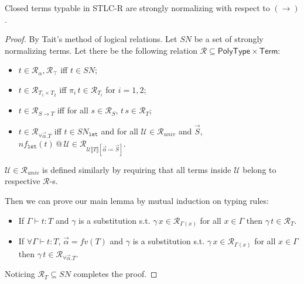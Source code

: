 \documentclass[acmsmall, review, screen, authorversion]{acmart}
\begin{document}
\begin{theorem}
    Closed terms typable in STLC-R are strongly normalizing with
    respect to $(\to)$.
\end{theorem}
\begin{proof}
    By Tait's method of logical relations. Let $SN$ be a set of
    strongly normalizing terms. Let there be the following relation
    $\mathcal{R}\subseteq\mathsf{PolyType}\times\mathsf{Term}$:

    \begin{itemize}
        \item $t\in\mathcal{R}_\alpha,\mathcal{R}_\top$ iff
            $t\in SN$;
        \item $t\in\mathcal{R}_{T_1\times T_2}$ iff
            $\pi_i\,t\in\mathcal{R}_{T_i}$ for $i=1,2$;
        \item $t\in\mathcal{R}_{S\to T}$ iff for all
            $s\in\mathcal{R}_S$, $t\,s\in\mathcal{R}_T$;
        \item $t\in\mathcal{R}_{\forall\vec{\alpha}.T}$ iff
            $t\in SN_\mathtt{let}$ and for all
            $\mathcal{U}\in\mathcal{R}_{univ}$ and $\vec{S}$,
            $nf_\mathtt{let}(t)\,@\,\mathcal{U}\in\mathcal{R}_{
                \mathcal{U}\llbracket T\rrbracket[
                    \vec{\alpha}\coloneqq\vec{S}]}$.
    \end{itemize}

    $\mathcal{U}\in\mathcal{R}_{univ}$ is defined similarly by
    requiring that all terms inside $\mathcal{U}$ belong to
    respective $\mathcal{R}$-s.

    Then we can prove our main lemma by mutual induction on typing
    rules:

    \begin{itemize}
        \item If $\Gamma\vdash t:T$ and $\gamma$ is a substitution
            s.t. $\gamma\,x\in\mathcal{R}_{\Gamma(x)}$ for all
            $x\in\Gamma$ then $\gamma\,t\in\mathcal{R}_T$.
        \item If $\forall\Gamma\vdash t:T$, $\vec{\alpha}=fv(T)$ and
            $\gamma$ is a substitution s.t.
            $\gamma\,x\in\mathcal{R}_{\Gamma(x)}$ for all
            $x\in\Gamma$ then
            $\gamma\,t\in\mathcal{R}_{\forall\vec{\alpha}.T}$.
    \end{itemize}

    Noticing $\mathcal{R}_T\subseteq SN$ completes the proof.
\end{proof}
\end{document}
